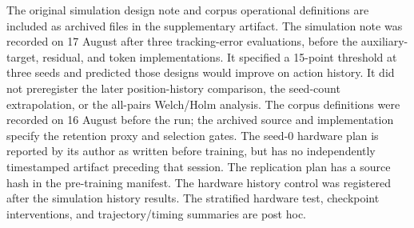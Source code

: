 \documentclass{article}
\begin{document}
\begin{table}[h]
\centering
\small
\caption{Achieved hardware timing from all 91 saved labeled-trial trajectories
in the original tracking-error comparison.
Rates are medians of per-rollout rates $(N-1)/(t_{N-1}-t_0)$.
Intervals are pooled medians between host timestamps recorded after command
submission, split at 30-command chunk boundaries. These are not bus latency
or encoder sample-age measurements. One seed-1 trajectory is missing.}
\label{tab:runtime}

\end{table}

The original simulation design note and corpus operational definitions are
included as archived files in the supplementary artifact. The simulation note
was recorded on 17 August after three tracking-error evaluations, before the
auxiliary-target, residual, and token implementations. It specified a 15-point
threshold at three seeds and predicted those designs would improve on action
history. It did not preregister the later position-history comparison, the
seed-count extrapolation, or the all-pairs Welch/Holm analysis. The corpus
definitions were recorded on 16 August before the run; the archived source
and implementation specify the retention proxy and selection gates.
The seed-0 hardware plan is reported by its author as written before training,
but has no independently timestamped artifact preceding that session. The
replication plan has a source hash in the pre-training manifest. The hardware history control
was registered after the simulation history results. The stratified hardware
test, checkpoint interventions, and trajectory/timing summaries are post hoc.
\end{document}
